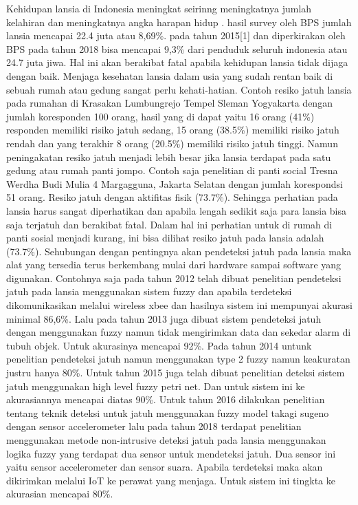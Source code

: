 \documentclass[11pt]{article}
\begin{document}
	Kehidupan lansia di Indonesia meningkat seirinng meningkatnya jumlah kelahiran dan meningkatnya angka harapan hidup . hasil survey oleh  BPS  jumlah lansia mencapai 22.4 juta atau  8,69\%. pada tahun 2015[1] dan diperkirakan oleh BPS pada tahun 2018 bisa mencapai 9,3\% dari penduduk seluruh indonesia atau 24.7 juta jiwa.
	Hal ini akan berakibat fatal apabila kehidupan lansia tidak dijaga dengan baik.
	Menjaga kesehatan lansia dalam usia yang sudah rentan baik di sebuah rumah atau gedung sangat perlu kehati-hatian.
	Contoh resiko jatuh lansia pada rumahan di Krasakan Lumbungrejo Tempel Sleman Yogyakarta dengan jumlah koresponden 100 orang, hasil yang di dapat  yaitu 16 orang (41\%) responden memiliki risiko jatuh sedang, 15 orang (38.5\%) memiliki risiko jatuh rendah dan yang terakhir 8 orang (20.5\%) memiliki risiko jatuh tinggi.
	Namun peningakatan resiko jatuh menjadi lebih besar jika lansia terdapat pada satu gedung atau rumah panti jompo.
	Contoh saja penelitian di panti social Tresna Werdha Budi Mulia 4 Margagguna, Jakarta Selatan dengan jumlah korespondsi 51 orang.
	Resiko jatuh dengan aktifitas fisik (73.7\%).
	Sehingga perhatian pada lansia harus sangat diperhatikan dan apabila lengah sedikit saja para lansia bisa saja terjatuh dan berakibat fatal.
	Dalam hal ini perhatian untuk di rumah di panti sosial menjadi kurang, ini bisa dilihat resiko jatuh pada lansia adalah (73.7\%).
	Sehubungan dengan pentingnya akan pendeteksi jatuh pada lansia maka alat yang tersedia terus berkembang mulai dari hardware sampai software yang digunakan.
	Contohnya saja pada tahun 2012 telah dibuat penelitian pendeteksi jatuh pada lansia menggunakan sistem fuzzy dan apabila terdeteksi dikomunikasikan melalui wireless xbee dan hasilnya sistem ini mempunyai akurasi minimal 86,6\%.
	Lalu pada tahun 2013 juga dibuat sistem pendeteksi jatuh dengan menggunakan fuzzy namun tidak mengirimkan data dan sekedar alarm di tubuh objek.
	Untuk akurasinya mencapai 92\%.
	Pada tahun 2014 untunk penelitian pendeteksi jatuh namun menggunakan type 2 fuzzy namun keakuratan justru hanya 80\%.
	Untuk tahun 2015 juga telah dibuat penelitian deteksi sistem jatuh menggunakan high level fuzzy petri net.
	Dan untuk sistem ini ke akurasiannya mencapai diatas 90\%.
	Untuk tahun 2016 dilakukan penelitian tentang teknik deteksi untuk jatuh menggunakan fuzzy model takagi sugeno dengan sensor accelerometer lalu pada tahun 2018 terdapat penelitian menggunakan metode non-intrusive deteksi jatuh pada lansia menggunakan logika fuzzy yang terdapat dua sensor untuk mendeteksi jatuh.
	Dua sensor ini yaitu sensor accelerometer dan sensor suara.
	Apabila terdeteksi maka akan dikirimkan melalui IoT ke perawat yang menjaga. Untuk sistem ini tingkta ke akurasian mencapai 80\%.
	
\end{document}
